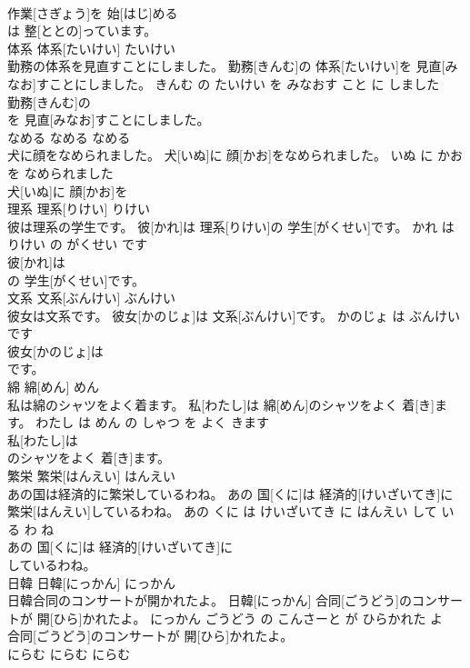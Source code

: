 \documentclass[8pt]{extreport}
\begin{document}
\begin{CJK}{UTF8}{min}
\\	作業[さぎょう]を 始[はじ]める
\\	は 整[ととの]っています。			
\\	体系	体系[たいけい]	たいけい	
\\	勤務の体系を見直すことにしました。	勤務[きんむ]の 体系[たいけい]を 見直[みなお]すことにしました。	きんむ の たいけい を みなおす こと に しました	
\\	勤務[きんむ]の
\\	を 見直[みなお]すことにしました。			
\\	なめる	なめる	なめる	
\\	犬に顔をなめられました。	犬[いぬ]に 顔[かお]をなめられました。	いぬ に かお を なめられました	
\\	犬[いぬ]に 顔[かお]を
\\	理系	理系[りけい]	りけい	
\\	彼は理系の学生です。	彼[かれ]は 理系[りけい]の 学生[がくせい]です。	かれ は りけい の がくせい です	
\\	彼[かれ]は
\\	の 学生[がくせい]です。			
\\	文系	文系[ぶんけい]	ぶんけい	
\\	彼女は文系です。	彼女[かのじょ]は 文系[ぶんけい]です。	かのじょ は ぶんけい です	
\\	彼女[かのじょ]は
\\	です。			
\\	綿	綿[めん]	めん	
\\	私は綿のシャツをよく着ます。	私[わたし]は 綿[めん]のシャツをよく 着[き]ます。	わたし は めん の しゃつ を よく きます	
\\	私[わたし]は
\\	のシャツをよく 着[き]ます。			
\\	繁栄	繁栄[はんえい]	はんえい	
\\	あの国は経済的に繁栄しているわね。	あの 国[くに]は 経済的[けいざいてき]に 繁栄[はんえい]しているわね。	あの くに は けいざいてき に はんえい して いる わ ね	
\\	あの 国[くに]は 経済的[けいざいてき]に
\\	しているわね。			
\\	日韓	日韓[にっかん]	にっかん	
\\	日韓合同のコンサートが開かれたよ。	日韓[にっかん] 合同[ごうどう]のコンサートが 開[ひら]かれたよ。	にっかん ごうどう の こんさーと が ひらかれた よ	
\\	合同[ごうどう]のコンサートが 開[ひら]かれたよ。			
\\	にらむ	にらむ	にらむ	

\end{CJK}
\end{document}
